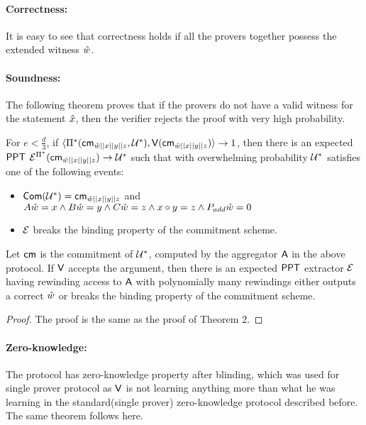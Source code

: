 \paragraph{Correctness: } It is easy to see that correctness holds if all the provers together possess the extended witness $\hat{w}$. 

\paragraph{Soundness: } The following theorem proves that if the provers do not have a valid witness for the statement $\hat{x}$, then the verifier rejects the proof with very high probability.

\begin{theorem}
	For $e < \frac{d}{3}$, if $\langle \Pi^*(\mathsf{cm}_{\hat{w}||x||y||z}, \mathcal{U}^*),\mathsf{V}(\mathsf{cm}_{\hat{w}||x||y||z})\rangle \rightarrow 1$, then there is an expected $\mathsf{PPT}$ $\mathcal{E}^{\Pi^*}(\mathsf{cm}_{\hat{w}||x||y||z}) \rightarrow \mathcal{U}^*$ such that with overwhelming probability $\mathcal{U}^*$ satisfies one of the following events:
	\begin{itemize}
		\item $\mathsf{Com}(\mathcal{U}^*)=\mathsf{cm}_{\hat{w}||x||y||z}$ and $A\hat{w} = x \wedge B \hat{w} = y \wedge C \hat{w} = z \wedge x\circ y =z \wedge P_{add} \hat{w} = 0$
		\item $\mathcal{E}$ breaks the binding property of the commitment scheme.
		
	\end{itemize}
	Let $\mathsf{cm}$ is the commitment of $\mathcal{U}^*$, computed by the aggregator $\mathsf{A}$ in the above protocol. If $\mathsf{V}$ accepts the argument, then there is an expected $\mathsf{PPT}$ extractor $\mathcal{E}$ having rewinding access to $\mathsf{A}$ with polynomially many rewindings either outputs a correct $\hat{w}$ or breaks the binding property of the commitment scheme.
\end{theorem}

\begin{proof}
	The proof is the same as the proof of Theorem 2.
\end{proof}

\paragraph{Zero-knowledge: } The protocol has zero-knowledge property after blinding, which was used for single prover protocol as $\mathsf{V}$ is not learning anything more than what he was learning in the standard(single prover) zero-knowledge protocol described before. The same theorem follows here.

